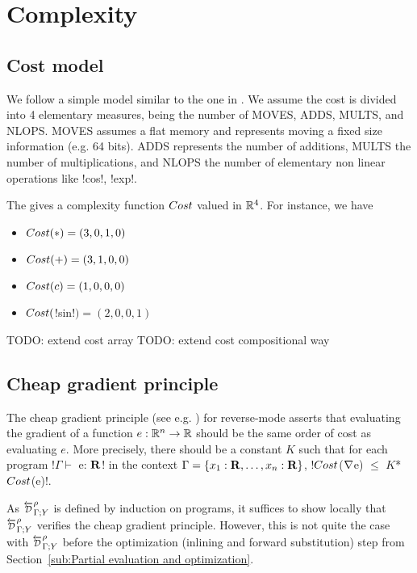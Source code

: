 \section{Complexity}
\label{sec:complexity}

\subsection{Cost model}
\label{sub:costModel}

We follow a simple model similar to the one in \cite{griewank2008evaluating}.
We assume the cost is divided into 4 elementary measures, being the number of MOVES, ADDS, MULTS, and NLOPS.
MOVES assumes a flat memory and represents moving a fixed size information  (e.g. 64 bits). 
ADDS represents the number of additions, 
MULTS the number of multiplications, 
and NLOPS the number of elementary non linear operations like !cos!, !exp!.

The gives a complexity function $Cost$ valued in $\mathbb{R}^4$. 
For instance, we have 

\begin{itemize}
    \item $Cost(*)=(3,0,1,0)$
    \item $Cost(+)=(3,1,0,0)$
    \item $Cost(c)=(1,0,0,0)$
    \item $Cost($!sin!$)=(2,0,0,1)$
\end{itemize}

TODO: extend cost array
TODO: extend cost compositional way

\subsection{Cheap gradient principle}

The cheap gradient principle (see e.g. \cite{griewank2008evaluating}) for reverse-mode
asserts that evaluating the gradient of a function $e:\mathbb{R}^n\to\mathbb{R}$ 
should be the same order of cost as evaluating $e$. 
More precisely, there should be a constant $K$ such that for each program !$\Gamma \vdash$ e: $\mathbf{R}$! in the context $\Gamma=\{x_1:\mathbf{R},\ldots,x_n:\mathbf{R}\}$,
 !$Cost$($\nabla$e) $\leq$ $K$*$Cost$(e)!.

As $\directD{\rho}{\Gamma}{Y}$ is defined by induction on programs, it suffices to show locally 
that $\directD{\rho}{\Gamma}{Y}$ verifies the cheap gradient principle. 
However, this is not quite the case with $\directD{\rho}{\Gamma}{Y}$ 
before the optimization (inlining and forward substitution) step from Section~\ref{sub:Partial evaluation and optimization}.

